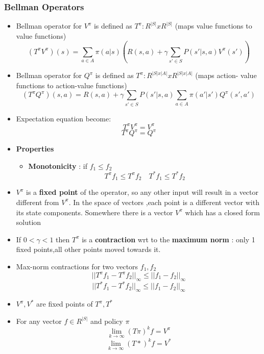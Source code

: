 \documentclass[12pt]{article} %
\begin{document}
\subsubsection{Bellman Operators}
\begin{itemize}
\item Bellman operator for $V^{\pi}$ is defined as $T^{\pi} : R^{|S|} x R^{|S|}$ (maps value functions to value functions)
$$(T^{\pi}V^{\pi})(s) = \sum_{a \in A} {\pi}(a|s)\left( R(s,a) + \gamma\sum_{s' \in S} P(s'|s,a)V^{\pi}(s') \right)$$

\item Bellman operator for $Q^{\pi}$ is defined as $T^{\pi} : R^{|S|x|A|} x R^{|S|x|A|}$ (maps action- value functions to action-value functions)
$$(T^{\pi}Q^{\pi})(s,a) =  R(s,a) + \gamma\sum_{s' \in S} P(s'|s,a) \sum_{a \in A} {\pi}(a'|s')Q^{\pi}(s',a')$$

\item Expectation equation become:
$$ T^{\pi}V^{\pi} = V^{\pi}$$
$$ T^{\pi}Q^{\pi} = Q^{\pi}$$

\item \textbf{Properties}
\begin{itemize}
\item \textbf{Monotonicity} : if $f_1 \leq f_2 $
$$ T^{\pi}f_1 \leq T^{\pi}f_2 \quad T^{*}f_1 \leq T^{*}f_2$$ 
\end{itemize}

\item $V^{\pi}$ is a \textbf{fixed point} of the operator, so any other input will result in a vector different from $V^{\pi}$. In the space of vectors ,each point is a different vector with its state components. Somewhere there is a vector $V^{\pi}$ which has a closed form solution

\item If $0 < \gamma < 1$ then $T^{\pi}$ is a \textbf{contraction} wrt to the \textbf{maximum norm} : only 1 fixed points,all other points moved towards it.

\item Max-norm contractions for two vectors $f_1,f_2$
$$ ||T^{\pi}f_1 - T^{\pi}f_2||_{\infty} \leq ||f_1-f_2||_{\infty}$$
$$ ||T^{*}f_1 - T^{*}f_2||_{\infty} \leq ||f_1-f_2||_{\infty}$$

\item $V^{\pi},V^{*}$ are fixed points of $T^{\pi},T^{*}$

\item For any vector $f \in R^{|S|}$ and policy $\pi$
$$ \lim_{k \to \infty } (T{\pi})^{k}f= V^{\pi}$$
$$ \lim_{k \to \infty } (T{*})^{k}f= V^{*}$$



\end{itemize}
\end{document}
